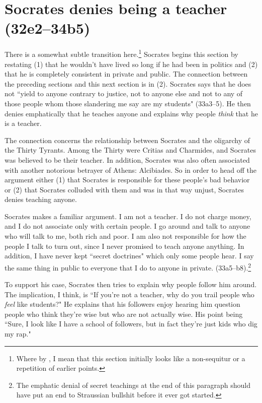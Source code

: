 \documentclass[11pt]{article}
\begin{document}
\section{Socrates denies being a teacher (32e2--34b5)}

There is a somewhat subtle transition here.\footnote{Where by , I mean that this section initially looks like a non-sequitur or a repetition of earlier points.}  Socrates begins this section by restating (1) that he wouldn't have lived so long if he had been in politics and (2) that he is completely consistent in private and public.  The connection between the preceding sections and this next section is in (2).  Socrates says that he does not ``yield to anyone contrary to justice, not to anyone else and not to any of those people whom those slandering me say are my students" (33a3--5).  He then denies emphatically that he teaches anyone and explains why people \emph{think} that he is a teacher.

The connection concerns the relationship between Socrates and the oligarchy of the Thirty Tyrants.  Among the Thirty were Critias and Charmides, and Socrates was believed to be their teacher.  In addition, Socrates was also often associated with another notorious betrayer of Athens: Alcibiades.  So in order to head off the argument either (1) that Socrates is responsible for these people's bad behavior or (2) that Socrates colluded with them and was in that way unjust, Socrates denies teaching anyone.

Socrates makes a familiar argument.  I am not a teacher.  I do not charge money, and I do not associate only with certain people.  I go around and talk to anyone who will talk to me, both rich and poor.  I am also not responsible for how the people I talk to turn out, since I never promised to teach anyone anything.  In addition, I have never kept ``secret doctrines" which only some people hear.  I say the same thing in public to everyone that I do to anyone in private. (33a5--b8).\footnote{The emphatic denial of secret teachings at the end of this paragraph should have put an end to Straussian bullshit before it ever got started.}

To support his case, Socrates then tries to explain why people follow him around.  The implication, I think, is ``If you're not a teacher, why do you trail people who \emph{feel} like students?"  He explains that his followers enjoy hearing him question people who think they're wise but who are not actually wise.  His point being ``Sure, I look like I have a school of followers, but in fact they're just kids who dig my rap."
\end{document}
